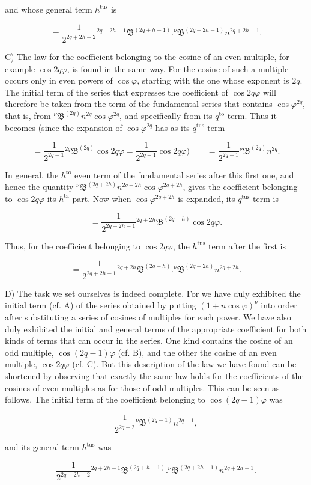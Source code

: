 \par\noindent{}%
and whose general term $h^{\text{tus}}$ is

\[
= \frac{1}{2^{2q+2h-2}} {}^{2q+2h-1}\mathfrak{B}^{(2q+h-1)}  .  {}^{\nu}\mathfrak{B}^{(2q+2h-1)} n^{2q+2h-1}.
\]

C) The law for the coefficient belonging to the cosine of an even multiple, for example $\cos 2q\varphi$, is found in the same way. For the cosine of such a multiple occurs only in even powers of $\cos\varphi$, starting with the one whose exponent is $2q$. The initial term of the series that expresses the coefficient of $\cos 2q\varphi$ will therefore be taken from the term of the fundamental series that contains $\cos\varphi^{2q}$, that is, from ${}^{\nu}\mathfrak{B}^{(2q)} n^{2q}\cos\varphi^{2q}$, and specifically from its $q^{\text{to}}$ term. Thus it becomes (since the expansion of $\cos\varphi^{2q}$ has as its $q^{\text{tus}}$ term

\[
= \frac{1}{2^{2q-1}} {}^{2q}\mathfrak{B}^{(2q)} \cos 2q\varphi = \frac{1}{2^{2q-1}} \cos 2q\varphi) \qquad = \frac{1}{2^{2q-1}} {}^{\nu}\mathfrak{B}^{(2q)} n^{2q}.
\]

\noindent In general, the $h^{\text{to}}$ even term of the fundamental series after this first one, and hence the quantity ${}^{\nu}\mathfrak{B}^{(2q+2h)} n^{2q+2h} \cos\varphi^{2q+2h}$, gives the coefficient belonging to $\cos 2q\varphi$ its $h^{\text{ta}}$ part. Now when $\cos\varphi^{2q+2h}$ is expanded, its $q^{\text{tus}}$ term is

\[
= \frac{1}{2^{2q+2h-1}} {}^{2q+2h}\mathfrak{B}^{(2q+h)} \cos 2q\varphi.
\]

\noindent Thus, for the coefficient belonging to $\cos 2q\varphi$, the $h^{\text{tus}}$ term after the first is

\[
= \frac{1}{2^{2q+2h-1}} {}^{2q+2h}\mathfrak{B}^{(2q+h)}  .  {}^{\nu}\mathfrak{B}^{(2q+2h)} n^{2q+2h}.
\]

D) The task we set ourselves is indeed complete. For we have duly exhibited the initial term (cf. A) of the series obtained by putting $(1+n\cos\varphi)^{\nu}$ into order after substituting a series of cosines of multiples for each power. We have also duly exhibited the initial and general terms of the appropriate coefficient for both kinds of terms that can occur in the series. One kind contains the cosine of an odd multiple, $\cos(2q-1)\varphi$ (cf. B), and the other the cosine of an even multiple, $\cos 2q\varphi$ (cf. C). But this description of the law we have found can be shortened by observing that exactly the same law holds for the coefficients of the cosines of even multiples as for those of odd multiples. This can be seen as follows. The initial term of the coefficient belonging to $\cos(2q-1)\varphi$ was

\[
\frac{1}{2^{2q-2}} {}^{\nu}\mathfrak{B}^{(2q-1)} n^{2q-1},
\]

\noindent and its general term $h^{\text{tus}}$ was

\[
\frac{1}{2^{2q+2h-2}} {}^{2q+2h-1}\mathfrak{B}^{(2q+h-1)}  .  {}^{\nu}\mathfrak{B}^{(2q+2h-1)} n^{2q+2h-1}.
\]
